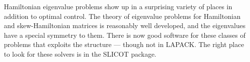 Hamiltonian eigenvalue problems show up in a surprising variety of
places in addition to optimal control. The theory of eigenvalue problems
for Hamiltonian and skew-Hamiltonian matrices is reasonably well
developed, and the eigenvalues have a special symmetry to them.  There
is now good software for these classes of problems that exploits the
structure --- though not in LAPACK.  The right place to look for these
solvers is in the SLICOT package.
